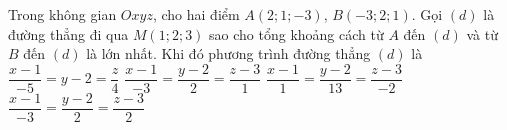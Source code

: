 \begin{ex}%
Trong không gian $Ox y z$, cho hai điểm $A(2; 1;-3)$, $B(-3; 2; 1)$. Gọi $(d)$ là đường thẳng đi qua $M(1; 2; 3)$ sao cho tổng khoảng cách từ $A$ đến $(d)$ và từ $B$ đến $(d)$ là lớn nhất. Khi đó phương trình đường thẳng $(d)$ là
	\choice
	{$\dfrac{x-1}{-5}=y-2=\dfrac{z}{4}$}
	{$\dfrac{x-1}{-3}=\dfrac{y-2}{2}=\dfrac{z-3}{1}$}
	{\True $\dfrac{x-1}{1}=\dfrac{y-2}{13}=\dfrac{z-3}{-2}$}
	{$\dfrac{x-1}{-3}=\dfrac{y-2}{2}=\dfrac{z-3}{2}$}
\end{ex}
